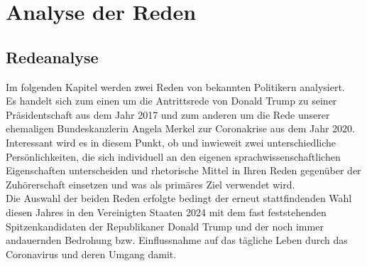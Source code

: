 \section{Analyse der Reden}
\label{sec: Analyse der Reden}

\subsection{Redeanalyse}
\label{sec: Redeanalyse}
Im folgenden Kapitel werden zwei Reden von bekannten Politikern analysiert. \\Es handelt sich zum einen um die Antrittsrede von Donald Trump zu seiner Präsidentschaft aus dem Jahr 2017 und zum anderen um die Rede unserer ehemaligen Bundeskanzlerin Angela Merkel zur Coronakrise aus dem Jahr 2020.
\\Interessant wird es in diesem Punkt, ob und inwieweit zwei unterschiedliche Persönlichkeiten, die sich individuell an den eigenen sprachwissenschaftlichen Eigenschaften unterscheiden und rhetorische Mittel in Ihren Reden gegenüber der Zuhörerschaft einsetzen und was als primäres Ziel verwendet wird. \\Die Auswahl der beiden Reden erfolgte bedingt der erneut stattfindenden Wahl diesen Jahres in den Vereinigten Staaten 2024 mit dem fast feststehenden Spitzenkandidaten der Republikaner Donald Trump und der noch immer andauernden Bedrohung bzw. Einflussnahme auf das tägliche Leben durch das Coronavirus und deren Umgang damit.


